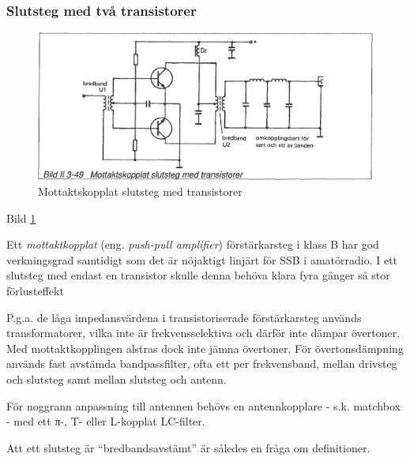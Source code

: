 \subsubsection{Slutsteg med två transistorer}

\begin{figure}
\includegraphics[width=\textwidth]{images/bild_2_3-49}
\caption{Mottaktskopplat slutsteg med transistorer}
\label{fig:BildII3-49}
\end{figure}

Bild \ref{fig:BildII3-49}

Ett \emph{mottaktkopplat} (eng. \emph{push-pull amplifier}) förstärkarsteg i
klass B har god verkningsgrad samtidigt som det är nöjaktigt linjärt för SSB i
amatörradio. I ett slutsteg med endast en transistor skulle denna
behöva klara fyra gånger så stor förlusteffekt

P.g.a. de låga impedansvärdena i transistoriserade förstärkarsteg
används transformatorer, vilka inte är frekvensselektiva och därför
inte dämpar övertoner. Med mottaktkopplingen alstras dock inte jämna
övertoner. För övertonsdämpning används fast avstämda bandpassfilter,
ofta ett per frekvensband, mellan drivsteg och slutsteg samt mellan
slutsteg och antenn.

För noggrann anpassning till antennen behövs en antennkopplare -
s.k. matchbox - med ett π-, T- eller L-kopplat LC-filter.

Att ett slutsteg är ``bredbandsavstämt'' är således en fråga om
definitioner.

